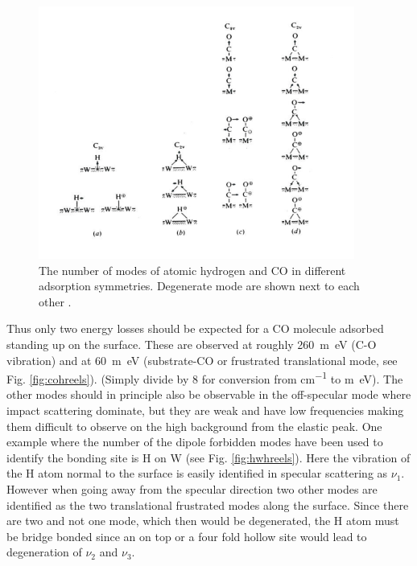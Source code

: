 \begin{figure}[h!]
	\begin{center}
	\includegraphics[scale=4]{figures/08_05.png}
	\caption{The number of modes of atomic hydrogen and CO in different adsorption symmetries. Degenerate mode are shown next to each other \cite{Bradshaw}.}
	\label{fig:hcomodes}
	\end{center}
\end{figure}

Thus only two energy losses should be expected for a CO molecule adsorbed standing up on the surface. These are observed at roughly \SI{260}{m\electronvolt} (C-O vibration) and at \SI{60}{m\electronvolt} (substrate-CO or frustrated translational mode, see Fig. \ref{fig:cohreels}). (Simply divide by 8 for conversion from \si{cm^{-1}} to \si{m\electronvolt}). The other modes should in principle also be observable in the off-specular mode where impact scattering dominate, but they are weak and have low frequencies making them difficult to observe on the high background from the elastic peak. One example where the number of the dipole forbidden modes have been used to identify the bonding site is H on W \cite{Barnes} (see Fig. \ref{fig:hwhreels}). Here the vibration of the H atom normal to the surface is easily identified in specular scattering as  $\nu_1$. However when going away from the specular direction two other modes are  identified as the two translational frustrated modes along the surface. Since there are two and not one mode, which then would be degenerated, the H atom must be bridge bonded since an on top or a  four fold hollow site would lead to degeneration of $\nu_2$ and $\nu_3$.

